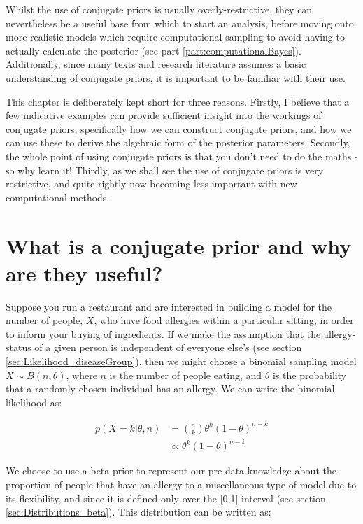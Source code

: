 \documentclass[11pt,fullpage]{book}
\begin{document}
Whilst the use of conjugate priors is usually overly-restrictive, they can nevertheless be a useful base from which to start an analysis, before moving onto more realistic models which require computational sampling to avoid having to actually calculate the posterior (see part \ref{part:computationalBayes}). Additionally, since many texts and research literature assumes a basic understanding of conjugate priors, it is important to be familiar with their use.  

This chapter is deliberately kept short for three reasons. Firstly, I believe that a few indicative examples can provide sufficient insight into the workings of conjugate priors; specifically how we can construct conjugate priors, and how we can use these to derive the algebraic form of the posterior parameters. Secondly, the whole point of using conjugate priors is that you don't need to do the maths - so why learn it! Thirdly, as we shall see the use of conjugate priors is very restrictive, and quite rightly now becoming less important with new computational methods.

\section{What is a conjugate prior and why are they useful?}
Suppose you run a restaurant and are interested in building a model for the number of people, $X$, who have food allergies within a particular sitting, in order to inform your buying of ingredients. If we make the assumption that the allergy-status of a given person is independent of everyone else's (see section \ref{sec:Likelihood_diseaseGroup}), then we might choose a binomial sampling model $X\sim B(n,\theta)$, where $n$ is the number of people eating, and $\theta$ is the probability that a randomly-chosen individual has an allergy. We can write the binomial likelihood as:

\begin{equation}
\begin{align}
p(X=k|\theta,n) &= {n \choose k} \theta^k (1-\theta)^{n-k}\\
&\propto \theta^k (1-\theta)^{n-k}
\end{align}
\end{equation}

We choose to use a beta prior to represent our pre-data knowledge about the proportion of people that have an allergy to a miscellaneous type of model due to its flexibility, and since it is defined only over the [0,1] interval (see section \ref{sec:Distributions_beta}). This distribution can be written as:
\end{document}
